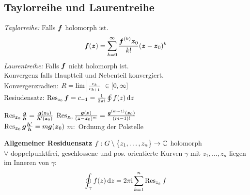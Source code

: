 \documentclass[german,color,5pt]{latex4ei/latex4ei_fs}
\begin{document}
\begin{sectionbox}
	\subsection{Taylorreihe und Laurentreihe}
	\emph{Taylorreihe:} Falls $\boldsymbol{f}$ holomorph ist.
	\begin{equation*}
		\boldsymbol{f}(\boldsymbol{z}) = \sum\limits_{k = 0}^{\infty} \frac{\boldsymbol{f}^{(k)} \boldsymbol{z}_0}{k!} (\boldsymbol{z} - \boldsymbol{z}_0)^k
	\end{equation*}
	\emph{Laurentreihe:} Falls $\boldsymbol{f}$ nicht holomorph ist.\\
	Konvergenz falls Hauptteil und Nebenteil konvergiert. \\ 
	Konvergenzradien: $R = \lim \left\vert\frac{c_k}{c_{k+1}}\right\vert \in [0, \infty]$ \\ 
	Resiudensatz: $\Res_{z_0} \cx f = c_{-1} = \frac{1}{2\pi\i} \oint f(z) \diff z$
	
	\begin{emphbox}
		\raggedright
		$\operatorname{Res}_{\boldsymbol{z}_0} \frac{\boldsymbol{g}}{\boldsymbol{h}} = \frac{\boldsymbol{g}(\boldsymbol{z}_0)}{\boldsymbol{h}'(\boldsymbol{z}_0)}$ \qquad $\operatorname{Res}_{\boldsymbol{z}_0} \frac{\boldsymbol{g}(\boldsymbol{z})}{(\boldsymbol{z} - \boldsymbol{z}_0)^m} = \frac{\boldsymbol{g}^{(m-1)}(\boldsymbol{z}_0)}{(m-1)!}$\\
		$\operatorname{Res}_{\boldsymbol{z}_0} \boldsymbol{g} \frac{\boldsymbol{h}'}{\boldsymbol{h}} = m \boldsymbol{g}(\boldsymbol{z}_0)$ \qquad $m:$ Ordnung der Polstelle
	\end{emphbox}
	\textbf{Allgemeiner Residuensatz} $f:G \setminus \bigl\{z_1, \ldots, z_n\bigr\} \rightarrow \mathbb C$ holomorph \\ 
	$\forall $ doppelpunktfrei, geschlossene und pos. orientierte Kurven $\gamma$ mit $z_1, \dots, z_n$ liegen im Inneren von $\gamma$:
	\begin{equation*}
		\oint_\gamma f(z) \diff z = 2 \pi \i \sum_{k=1}^{n} \Res_{z_k} f
	\end{equation*}
\end{sectionbox}
\end{document}
